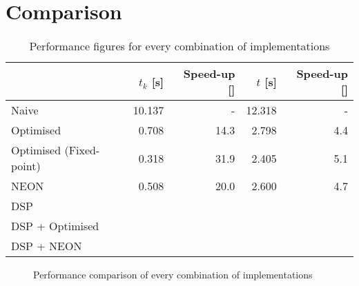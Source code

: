 \documentclass[final]{article}
\begin{document}
\section{Comparison}
\label{sec:comparison}

\begin{table}[H]
	\centering
	\caption{Performance figures for every combination of implementations}
	\begin{tabular}{lrrrr}
		\toprule
							& \textbf{$t_k$ [\si{\second}]}	& \textbf{Speed-up [\si{\speedup}]}	& \textbf{$t$ [\si{\second}]}	& \textbf{Speed-up [\si{\speedup}]} \\
		\midrule
		Naive				& 10.137	& -			 	& 12.318	& -				\\
		Optimised			&  0.708	& 14.3		 	&  2.798	& 4.4			\\
		Optimised (Fixed-point)	&  0.318	& 31.9		 	&  2.405	& 5.1			\\
		NEON				&  0.508	& 20.0		 	&  2.600	& 4.7			\\
		DSP					& 			& 			 	& 			& 				\\
		DSP + Optimised		& 			& 			 	& 			& 				\\
		DSP + NEON			& 			& 			 	& 			& 				\\
		\bottomrule
	\end{tabular}
	\label{tab:comparison}
\end{table}

\setlength\figureheight{6cm}
\setlength\figurewidth{9cm}
\begin{figure}[H]
	\centering
	
	\caption{Performance comparison of every combination of implementations}
	\label{fig:comparison}
\end{figure}
\end{document}
